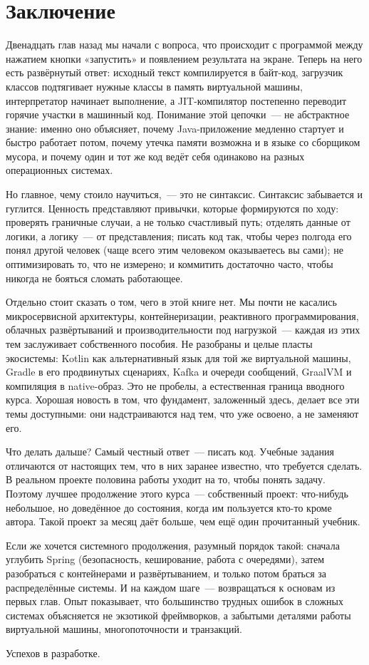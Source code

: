 \chapter*{Заключение}

Двенадцать глав назад мы начали с вопроса, что происходит с программой между
нажатием кнопки «запустить» и появлением результата на экране. Теперь на него есть
развёрнутый ответ: исходный текст компилируется в байт-код, загрузчик классов
подтягивает нужные классы в память виртуальной машины, интерпретатор начинает
выполнение, а JIT-компилятор постепенно переводит горячие участки в машинный код.
Понимание этой цепочки~--- не абстрактное знание: именно оно объясняет, почему
Java-приложение медленно стартует и быстро работает потом, почему утечка памяти
возможна и в языке со сборщиком мусора, и почему один и тот же код ведёт себя
одинаково на разных операционных системах.

Но главное, чему стоило научиться,~--- это не синтаксис. Синтаксис забывается и
гуглится. Ценность представляют привычки, которые формируются по ходу:
проверять граничные случаи, а не только счастливый путь; отделять данные от
логики, а логику~--- от представления; писать код так, чтобы через полгода его
понял другой человек (чаще всего этим человеком оказываетесь вы сами);
не оптимизировать то, что не измерено; и коммитить достаточно часто, чтобы
никогда не бояться сломать работающее.

Отдельно стоит сказать о том, чего в этой книге нет. Мы почти не касались
микросервисной архитектуры, контейнеризации, реактивного программирования,
облачных развёртываний и производительности под нагрузкой~--- каждая из этих тем
заслуживает собственного пособия. Не разобраны и целые пласты экосистемы: Kotlin
как альтернативный язык для той же виртуальной машины, Gradle в его продвинутых
сценариях, Kafka и очереди сообщений, GraalVM и компиляция в native-образ. Это
не пробелы, а естественная граница вводного курса. Хорошая новость в том, что
фундамент, заложенный здесь, делает все эти темы доступными: они надстраиваются
над тем, что уже освоено, а не заменяют его.

Что делать дальше? Самый честный ответ~--- писать код. Учебные задания отличаются
от настоящих тем, что в них заранее известно, что требуется сделать. В реальном
проекте половина работы уходит на то, чтобы понять задачу. Поэтому лучшее
продолжение этого курса~--- собственный проект: что-нибудь небольшое, но доведённое
до состояния, когда им пользуется кто-то кроме автора. Такой проект за месяц даёт
больше, чем ещё один прочитанный учебник.

Если же хочется системного продолжения, разумный порядок такой: сначала углубить
Spring (безопасность, кеширование, работа с очередями), затем разобраться
с контейнерами и развёртыванием, и только потом браться за распределённые
системы. И на каждом шаге~--- возвращаться к основам из первых глав. Опыт
показывает, что большинство трудных ошибок в сложных системах объясняется не
экзотикой фреймворков, а забытыми деталями работы виртуальной машины,
многопоточности и транзакций.

Успехов в разработке.
